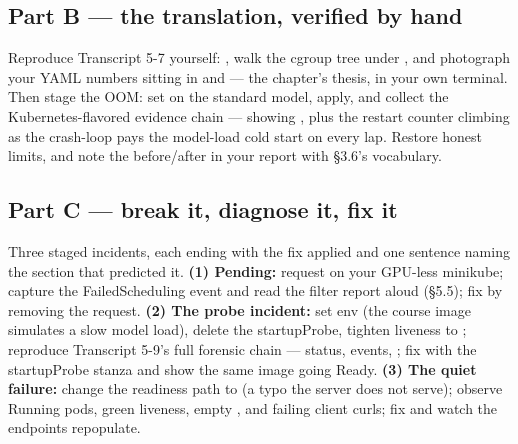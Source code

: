 \subsection*{Part B — the translation, verified by hand}

Reproduce Transcript 5-7 yourself: , walk the cgroup tree under , and photograph your YAML numbers sitting in  and  — the chapter's thesis, in your own terminal. Then stage the OOM: set  on the standard model, apply, and collect the Kubernetes-flavored evidence chain —  showing , plus the restart counter climbing as the crash-loop pays the model-load cold start on every lap. Restore honest limits, and note the before/after in your report with §3.6's vocabulary.

\subsection*{Part C — break it, diagnose it, fix it}

Three staged incidents, each ending with the fix applied and one sentence naming the section that predicted it. \textbf{(1) Pending:} request  on your GPU-less minikube; capture the FailedScheduling event and read the filter report aloud (§5.5); fix by removing the request. \textbf{(2) The probe incident:} set env  (the course image simulates a slow model load), delete the startupProbe, tighten liveness to ; reproduce Transcript 5-9's full forensic chain — status, events, ; fix with the startupProbe stanza and show the same image going Ready. \textbf{(3) The quiet failure:} change the readiness path to  (a typo the server does not serve); observe Running pods, green liveness, empty , and failing client curls; fix and watch the endpoints repopulate.

